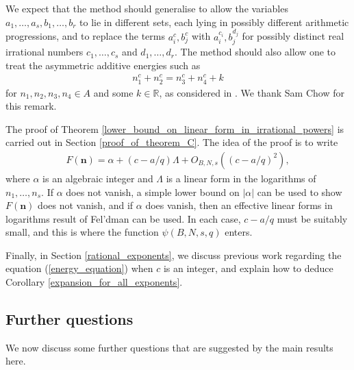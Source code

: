 \documentclass[9pt]{amsart}
\theoremstyle{my_theorem_style}
\numberwithin{definition}{section}
\newcommand{\R}{\mathbb{R}}
\renewcommand{\vec}[1]{\bm{#1}}
\begin{document}
We expect that the method should generalise to allow the variables $a_1, \dots, a_s, b_1, \dots, b_r$ to lie in different sets, each lying in possibly different arithmetic progressions, and to replace the terms $a_i^c, b_j^c$ with $a_i^{c_i}, b_j^{d_j}$ for possibly distinct real irrational numbers $c_1, \dots, c_s$ and $d_1, \dots, d_r$. The method should also allow one to treat the asymmetric additive energies such as
\begin{align*}
    n_1^c + n_2^c = n_3^c + n_4^c + k
\end{align*}
for $n_1, n_2, n_3, n_4 \in A$ and some $k \in \R$, as considered in \cite{McGrath_on_the_asymmetric_additive_energy_of_polynomials}. We thank Sam Chow for this remark.

The proof of Theorem \ref{lower_bound_on_linear_form_in_irrational_powers} is carried out in Section \ref{proof_of_theorem_C}. The idea of the proof is to write
\begin{align*}
    F(\vec{n}) = \alpha + (c - a/q) \Lambda
    + O_{B, N, s}((c - a/q)^2),
\end{align*}
where $\alpha$ is an algebraic integer and $\Lambda$ is a linear form in the logarithms of $n_1, \dots, n_s$. If $\alpha$ does not vanish, a simple lower bound on $|\alpha|$ can be used to show $F(\vec{n})$ does not vanish, and if $\alpha$ does vanish, then an effective linear forms in logarithms result of Fel'dman \cite[Theorem 1]{Fel'dman_an_improvement_of_the_estimate_of_a_linear_form_in_the_logarithms_of_algebraic_numbers} can be used. In each case, $c - a/q$ must be suitably small, and this is where the function $\psi(B, N, s, q)$ enters.

Finally, in Section \ref{rational_exponents}, we discuss previous work regarding the equation (\ref{energy_equation}) when $c$ is an integer, and explain how to deduce Corollary \ref{expansion_for_all_exponents}.

\subsection{Further questions}

We now discuss some further questions that are suggested by the main results here.
\end{document}
